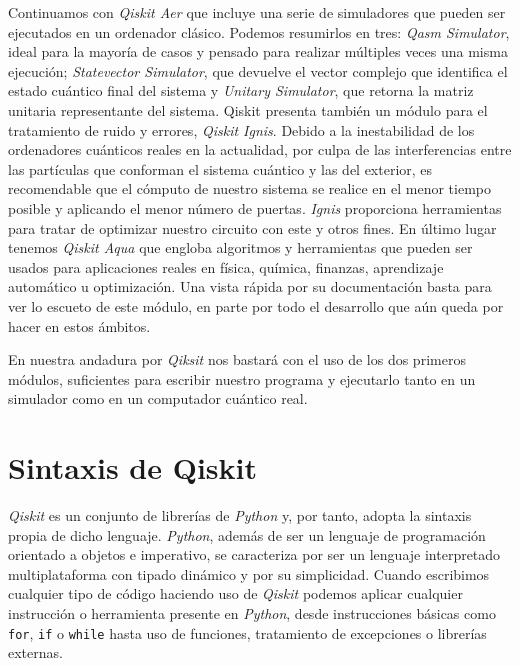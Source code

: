 Continuamos con \textit{Qiskit Aer} que incluye una serie de simuladores que pueden ser ejecutados en un ordenador clásico. Podemos resumirlos en tres: \textit{Qasm Simulator}, ideal para la mayoría de casos y pensado para realizar múltiples veces una misma ejecución; \textit{Statevector Simulator}, que devuelve el vector complejo que identifica el estado cuántico final del sistema y \textit{Unitary Simulator}, que retorna la matriz unitaria representante del sistema. Qiskit presenta también un módulo para el tratamiento de ruido y errores, \textit{Qiskit Ignis}. Debido a la inestabilidad de los ordenadores cuánticos reales en la actualidad, por culpa de las interferencias entre las partículas que conforman el sistema cuántico y las del exterior, es recomendable que el cómputo de nuestro sistema se realice en el menor tiempo posible y aplicando el menor número de puertas. \textit{Ignis} proporciona herramientas para tratar de optimizar nuestro circuito con este y otros fines. En último lugar tenemos \textit{Qiskit Aqua} que engloba algoritmos y herramientas que pueden ser usados para aplicaciones reales en física, química, finanzas, aprendizaje automático u optimización. Una vista rápida por su documentación basta para ver lo escueto de este módulo, en parte por todo el desarrollo que aún queda por hacer en estos ámbitos.

En nuestra andadura por \textit{Qiksit} nos bastará con el uso de los dos primeros módulos, suficientes para escribir nuestro programa y ejecutarlo tanto en un simulador como en un computador cuántico real.

\section{Sintaxis de Qiskit}

\textit{Qiskit} es un conjunto de librerías de \textit{Python} y, por tanto, adopta la sintaxis propia de dicho lenguaje. \textit{Python}, además de ser un lenguaje de programación orientado a objetos e imperativo, se caracteriza por ser un lenguaje interpretado multiplataforma con tipado dinámico y por su simplicidad. Cuando escribimos cualquier tipo de código haciendo uso de \textit{Qiskit} podemos aplicar cualquier instrucción o herramienta presente en \textit{Python}, desde instrucciones básicas como \texttt{for}, \texttt{if} o \texttt{while} hasta uso de funciones, tratamiento de excepciones o librerías externas.

